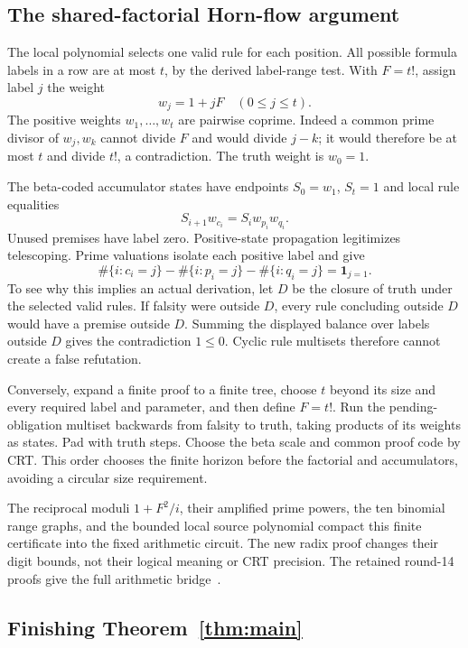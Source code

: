 \documentclass[11pt]{article}
\theoremstyle{definition}\newtheorem{definition}[theorem]{Definition}
\theoremstyle{remark}\newtheorem{remark}[theorem]{Remark}
\begin{document}
\subsection{The shared-factorial Horn-flow argument}

The local polynomial selects one valid rule for each position. All possible formula labels in a row are at most $t$, by the derived label-range test. With $F=t!$, assign label $j$ the weight
\[
 w_j=1+jF\quad(0\le j\le t).
\]
The positive weights $w_1,\ldots,w_t$ are pairwise coprime. Indeed a common prime divisor of $w_j,w_k$ cannot divide $F$ and would divide $j-k$; it would therefore be at most $t$ and divide $t!$, a contradiction. The truth weight is $w_0=1$.

The beta-coded accumulator states have endpoints $S_0=w_1$, $S_t=1$ and local rule equalities
\[
 S_{i+1}w_{c_i}=S_iw_{p_i}w_{q_i}.
\]
Unused premises have label zero. Positive-state propagation legitimizes telescoping. Prime valuations isolate each positive label and give
\[
 \#\{i:c_i=j\}-\#\{i:p_i=j\}-\#\{i:q_i=j\}
     =\mathbf1_{j=1}.
\]
To see why this implies an actual derivation, let $D$ be the closure of truth under the selected valid rules. If falsity were outside $D$, every rule concluding outside $D$ would have a premise outside $D$. Summing the displayed balance over labels outside $D$ gives the contradiction $1\le0$. Cyclic rule multisets therefore cannot create a false refutation.

Conversely, expand a finite proof to a finite tree, choose $t$ beyond its size and every required label and parameter, and then define $F=t!$. Run the pending-obligation multiset backwards from falsity to truth, taking products of its weights as states. Pad with truth steps. Choose the beta scale and common proof code by CRT. This order chooses the finite horizon before the factorial and accumulators, avoiding a circular size requirement.

The reciprocal moduli $1+F^2/i$, their amplified prime powers, the ten binomial range graphs, and the bounded local source polynomial compact this finite certificate into the fixed arithmetic circuit. The new radix proof changes their digit bounds, not their logical meaning or CRT precision. The retained round-14 proofs give the full arithmetic bridge~\cite{round14}.

\subsection{Finishing Theorem~\ref{thm:main}}
\end{document}
